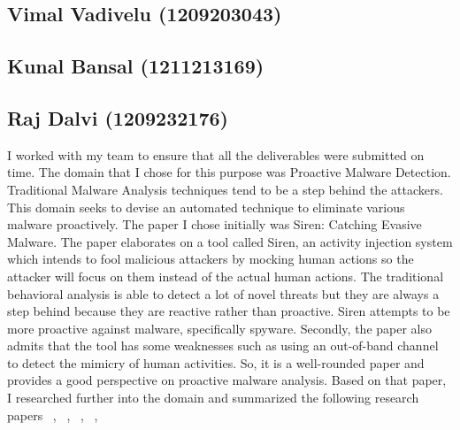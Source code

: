 \documentclass[11pt]{article}
\begin{document}
\subsection{Vimal Vadivelu (1209203043)}


\subsection{Kunal Bansal (1211213169)}

\subsection{Raj Dalvi (1209232176)}
I worked with my team to ensure that all the deliverables were submitted on time. The domain that I chose for this purpose was Proactive Malware Detection. Traditional Malware Analysis techniques tend to be a step behind the attackers. This domain seeks to devise an automated technique to eliminate various malware proactively. The paper I chose initially was Siren: Catching Evasive Malware. The paper elaborates on a tool called Siren, an activity injection system which intends to fool malicious attackers
by mocking human actions so the attacker will focus on them instead of the actual human actions. The traditional behavioral analysis is able to detect a lot of novel threats but they are always a step behind because they are reactive rather than proactive. Siren attempts to be more proactive against malware, specifically spyware. Secondly, the paper also admits that the tool has some weaknesses such as using an out-of-band channel to detect the mimicry of human activities. So, it is a well-rounded paper and provides a good perspective on proactive malware analysis. Based on that paper, I researched further into the domain and summarized the following research papers ~\cite{cyberthreatanalysis}, ~\cite{hookscout}, ~\cite{behaviorbasedproactive}, ~\cite{softcomputingproactive}, ~\cite{nidsproactive}
	
\end{document}
